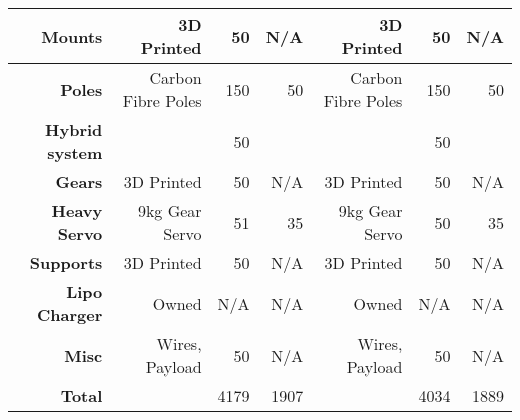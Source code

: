 \begin{landscape}
\begin{table}[!htbp]
\begin{tabular}{|r|r|r|r|r|r|r|}
		\hline
		\textbf{Mounts} & 3D Printed & 50 & N/A & 3D Printed & 50 & N/A\\
		\hline
		\textbf{Poles} & Carbon Fibre Poles & 150 & 50 & Carbon Fibre Poles & 150 & 50\\
		\hline
		\textbf{Hybrid system} &  & 50 & & & 50 & \\
		\hline
		\textbf{Gears} & 3D Printed & 50 & N/A & 3D Printed & 50 & N/A\\
		\hline
		\textbf{Heavy Servo} & 9kg Gear Servo & 51 & 35 & 9kg Gear Servo & 50 & 35\\
		\hline
		\textbf{Supports} & 3D Printed & 50 & N/A & 3D Printed & 50 & N/A\\
		\hline
		\textbf{Lipo Charger} & Owned & N/A & N/A & Owned & N/A & N/A\\
		\hline
		\textbf{Misc} & Wires, Payload & 50 & N/A & Wires, Payload & 50 & N/A\\
		\hline
		\textbf{Total} & & 4179 & 1907 &  & 4034 & 1889\\
		\hline
	\end{tabular} 
	\label{tab:x8costs}
\end{table}
\end{landscape}

